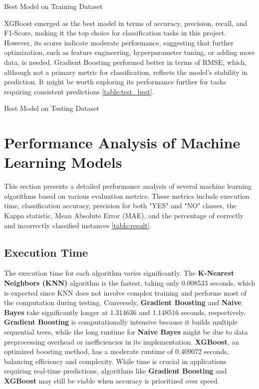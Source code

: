 \documentclass[pdflatex,sn-nature,Numbered]{sn-jnl}%
\theoremstyle{thmstyleone}%
\theoremstyle{thmstyletwo}%
\theoremstyle{thmstylethree}%
\begin{document}
\begin{table}[h] 
\caption{Best Model on Training Dataset}  %
\label{table:train_best}
\end{table}

XGBoost emerged as the best model in terms of accuracy, precision, recall, and F1-Score, making it the top choice for classification tasks in this project. However, its scores indicate moderate performance, suggesting that further optimization, such as feature engineering, hyperparameter tuning, or adding more data, is needed.
Gradient Boosting performed better in terms of RMSE, which, although not a primary metric for classification, reflects the model's stability in prediction. It might be worth exploring its performance further for tasks requiring consistent predictions \autoref{table:test_best}.

\begin{table}[h] 
\caption{Best Model on Testing Dataset}  %
\label{table:test_best}
\end{table}

\section{Performance Analysis of Machine Learning Models}

This section presents a detailed performance analysis of several machine learning algorithms based on various evaluation metrics. These metrics include execution time, classification accuracy, precision for both "YES" and "NO" classes, the Kappa statistic, Mean Absolute Error (MAE), and the percentage of correctly and incorrectly classified instances \autoref{table:result}.

\subsection{Execution Time}
The execution time for each algorithm varies significantly. The \textbf{K-Nearest Neighbors (KNN)} algorithm is the fastest, taking only 0.008533 seconds, which is expected since KNN does not involve complex training and performs most of the computation during testing. Conversely, \textbf{Gradient Boosting} and \textbf{Naive Bayes} take significantly longer at 1.314636 and 1.148516 seconds, respectively. \textbf{Gradient Boosting} is computationally intensive because it builds multiple sequential trees, while the long runtime for \textbf{Naive Bayes} might be due to data preprocessing overhead or inefficiencies in its implementation. \textbf{XGBoost}, an optimized boosting method, has a moderate runtime of 0.409072 seconds, balancing efficiency and complexity. While time is crucial in applications requiring real-time predictions, algorithms like \textbf{Gradient Boosting} and \textbf{XGBoost} may still be viable when accuracy is prioritized over speed.
\end{document}
